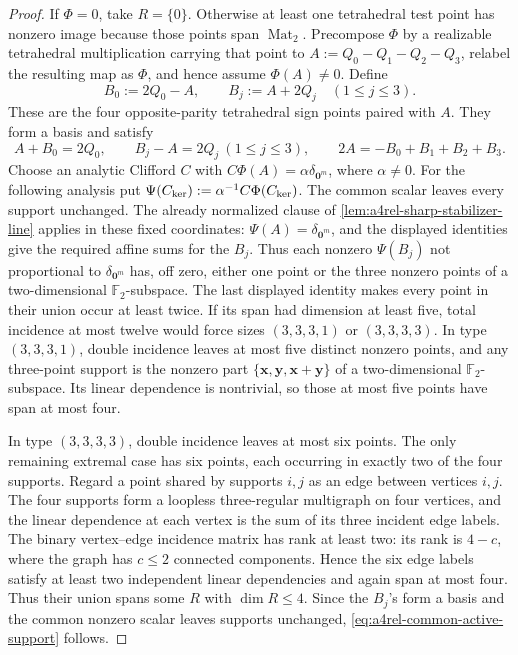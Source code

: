 \documentclass[11pt,letterpaper,onecolumn]{article}
\theoremstyle{plain}
\theoremstyle{definition}
\theoremstyle{remark}
\newcommand{\Ftwo}{\mathbb F_2}
\newcommand{\Mat}{\operatorname{Mat}}
\newcommand{\zero}{\mathbf 0}
\begin{document}
\begin{proof}
If \(\Phi=0\), take \(R=\{0\}\).  Otherwise at least one tetrahedral test
point has nonzero image because those points span \(\Mat_2\).  Precompose
\(\Phi\) by a realizable tetrahedral multiplication carrying that point to
\(A:=Q_0-Q_1-Q_2-Q_3\), relabel the resulting map as \(\Phi\), and hence
assume \(\Phi(A)\ne0\).  Define
\[
 B_0:=2Q_0-A,\qquad B_j:=A+2Q_j\quad(1\le j\le3).
\]
These are the four opposite-parity tetrahedral sign points paired with
\(A\). They
form a basis and satisfy
\[
 A+B_0=2Q_0,\qquad B_j-A=2Q_j\ (1\le j\le3),\qquad
 2A=-B_0+B_1+B_2+B_3.
\]
Choose an analytic Clifford \(C\) with
\(C\Phi(A)=\alpha\delta_{\zero^m}\), where \(\alpha\ne0\).
For the following analysis put \(\Psi(C_{\rm ker}):=\alpha^{-1}C\Phi(C_{\rm ker})\).
The common scalar leaves every support unchanged.  The already normalized clause of
\cref{lem:a4rel-sharp-stabilizer-line} applies in these fixed coordinates:
\(\Psi(A)=\delta_{\zero^m}\), and the displayed identities give the required
affine sums for the \(B_j\).  Thus each nonzero
\(\Psi(B_j)\) not proportional to \(\delta_{\zero^m}\) has, off zero, either
one point or the three nonzero points of a two-dimensional
\(\Ftwo\)-subspace.  The last displayed identity makes
every point in their union occur at least twice.  If its span had dimension
at least five, total incidence at most twelve would force sizes
\((3,3,3,1)\) or \((3,3,3,3)\).  In type \((3,3,3,1)\), double incidence
leaves at most five distinct nonzero points, and any three-point support is
the nonzero part \(\{{\mathbf{x}},{\mathbf{y}},{\mathbf{x}}+{\mathbf{y}}\}\) of a two-dimensional
\(\Ftwo\)-subspace.  Its linear dependence is
nontrivial, so those at most five points have span at most four.

In type \((3,3,3,3)\), double incidence leaves at most six points.  The only
remaining extremal case has six points, each occurring in exactly two of
the four supports.  Regard a point shared by supports \(i,j\) as an edge
between vertices \(i,j\).  The four supports form a loopless
three-regular multigraph on four vertices, and the linear dependence at each
vertex is the sum of its three incident edge labels.  The binary
vertex--edge incidence matrix has rank at least two: its rank is
\(4-c\), where the graph has \(c\le2\) connected components.  Hence the six
edge labels satisfy at least two independent linear dependencies and again span at
most four.  Thus their union spans some \(R\) with \(\dim R\le4\).  Since
the \(B_j\)'s form a basis and the common nonzero scalar leaves
supports unchanged, \cref{eq:a4rel-common-active-support} follows.
\end{proof}
\end{document}
